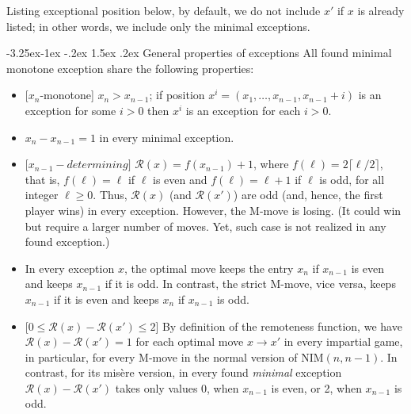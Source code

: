 \documentclass[10pt]{article}
\makeatletter
\renewcommand\subsection{\@startsection{subsection}{2}{\z@}
{-3.25ex\@plus -1ex \@minus -.2ex}
{1.5ex \@plus .2ex}
{\normalfont\normalsize\bfseries\boldmath}}
\theoremstyle{definition}
\def\R{\mathcal{R}}
\makeatother
\begin{document}

Listing exceptional position below,   
by default, we do not include  $x'$  
if  $x$  is already listed;  
in other words, we include only the minimal exceptions. 

\subsection{General properties of exceptions}
\label{ss11b} 
All found minimal monotone exception 
share the following properties: 

\begin{itemize}
\item{[$x_n$-monotone]}  $x_n > x_{n-1}$;  
if position  $x^i = (x_1, \dots, x_{n-1}, x_{n-1} + i)$  
is an exception for some  $i > 0$  
then  $x^i$  is an exception for each  $i > 0$. 

\item{$x_n - x_{n-1} = 1$} in every minimal exception. 

\item{[$x_{n-1}-determining]$} 
$\R(x) = f(x_{n-1}) + 1$, where 
$f(\ell) = 2 \lceil \ell/2 \rceil$, that is, 
$f(\ell) = \ell$  if $\ell$ is even 
and  $f(\ell) = \ell+1$  if  $\ell$  is odd, 
for all integer $\ell \geq 0$. 
\newline 
Thus, $\R(x)$  (and $\R(x')$) are odd 
(and, hence, the first player wins) in every exception.
However, the M-move is losing. 
(It could win but require a larger number of moves.
Yet, such case is not realized in any found exception.)  

\item 
In every exception $x$, 
the optimal move keeps the entry $x_n$ 
if $x_{n-1}$  is even and keeps $x_{n-1}$ 
if it is odd. 
In contrast, the strict M-move, 
vice versa, keeps  $x_{n-1}$ 
if it is even and keeps $x_n$ 
if  $x_{n-1}$  is odd. 

\item{[$0 \leq \R(x) - \R(x') \leq 2$]} 
By definition of the remoteness function, 
we have  $\R(x)-\R(x')=1$  
for each optimal move $x \to x'$  in every impartial game,  
in particular, for every M-move 
in the normal version of NIM$(n,n-1)$. 
In contrast, for its mis\`ere version, 
in every found {\em minimal} exception 
$\R(x) - \R(x')$  takes only 
values 0, when $x_{n-1}$ is even, or 2, when $x_{n-1}$ is odd. 

\bigskip


\end{itemize}
\end{document}
